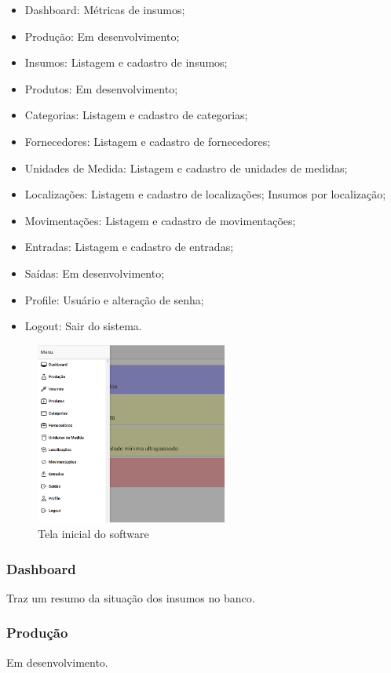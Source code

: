 \documentclass[letterpaper, 12 pt]{article}
\begin{document}
\begin{itemize}
  \item Dashboard: Métricas de insumos;
  \item Produção: Em desenvolvimento;
  \item Insumos: Listagem e cadastro de insumos;
  \item Produtos: Em desenvolvimento; 
  \item Categorias: Listagem e cadastro de categorias;
  \item Fornecedores: Listagem e cadastro de fornecedores;
  \item Unidades de Medida: Listagem e cadastro de unidades de medidas;
  \item Localizações: Listagem e cadastro de localizações; Insumos por localização;
  \item Movimentações: Listagem e cadastro de movimentações;
  \item Entradas: Listagem e cadastro de entradas;
  \item Saídas: Em desenvolvimento;
  \item Profile: Usuário e alteração de senha;
  \item Logout: Sair do sistema.
\end{itemize}

\begin{figure}[h]
\centering %
\includegraphics[height=6cm]{imagens/menu1.PNG} 
\caption{Tela inicial do software}
\label{figura:menu1}
\end{figure}

\subsubsection{Dashboard}
Traz um resumo da situação dos insumos no banco. 

\subsubsection{Produção}
Em desenvolvimento.
\newpage
\end{document}
